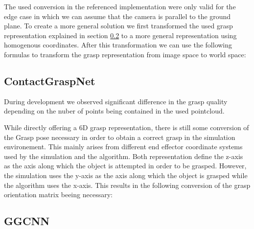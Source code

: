 The used conversion in the referenced implementation were only valid for the edge case in which we can assume that the camera is parallel to the ground plane.
To create a more general solution we first transformed the used grasp representation explained in section \ref{} to a more general representation using homogenous coordinates.
After this transformation we can use the following formulas to transform the grasp representation from image space to world space:

\subsection{ContactGraspNet}
During development we observed significant difference in the grasp quality depending on the nuber of points being contained in the used pointcloud.

While directly offering a 6D grasp representation, there is still some conversion of the Grasp pose necessary in order to obtain a correct grasp in the simulation environement.
This mainly arises from different end effector coordinate systems used by the simulation and the algorithm.
Both representation define the z-axis as the axis along which the object is attempted in order to be grasped.
However, the simulation uses the y-axis as the axis along which the object is grasped while the algorithm uses the x-axis.
This results in the following conversion of the grasp orientation matrix beeing necessary:

\subsection{GGCNN}

